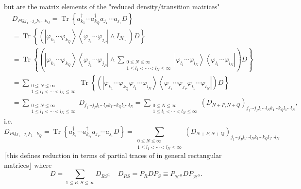 \documentclass[aps,preprint]{revtex4}%
\begin{document}
but are the matrix elements of the "reduced density/transition matrices"
\begin{align}
&  D_{PQj_{1}\cdots j_{P}k_{1}\cdots k_{Q}}=\operatorname{Tr}\left\{
a_{k_{1}}^{\dagger}\cdots a_{k_{Q}}^{\dagger}a_{j_{P}}\cdots a_{j_{1}%
}D\right\} \nonumber\\
&  =\operatorname{Tr}\left\{  \left(  \left\vert \varphi_{k_{1}}\cdots
\varphi_{k_{Q}}\right\rangle \left\langle \varphi_{j_{1}}\cdots\varphi_{j_{P}%
}\right\vert \wedge I_{\mathcal{H}_{\mathcal{F}}}\right)  D\right\}
\nonumber\\
&  =\operatorname{Tr}\left\{  \left(  \left\vert \varphi_{k_{1}}\cdots
\varphi_{k_{Q}}\right\rangle \left\langle \varphi_{j_{1}}\cdots\varphi_{j_{P}%
}\right\vert \wedge\sum_{\substack{0\leq N\leq\infty\\1\leq l_{1}<\cdots
<l_{N}\leq\infty}}\left\vert \varphi_{l_{1}}\cdots\varphi_{l_{N}}\right\rangle
\left\langle \varphi_{l_{1}}\cdots\varphi_{l_{N}}\right\vert \right)
D\right\} \nonumber\\
&  =\sum_{\substack{0\leq N\leq\infty\\1\leq l_{1}<\cdots<l_{N}\leq\infty
}}\operatorname{Tr}\left\{  \left(  \left\vert \varphi_{k_{1}}\cdots
\varphi_{k_{Q}}\varphi_{l_{1}}\cdots\varphi_{l_{N}}\right\rangle \left\langle
\varphi_{j_{1}}\cdots\varphi_{j_{P}}\varphi_{l_{1}}\cdots\varphi_{l_{N}%
}\right\vert \right)  D\right\} \nonumber\\
&  =\sum_{\substack{0\leq N\leq\infty\\1\leq l_{1}<\cdots<l_{N}\leq\infty
}}D_{j_{1}\cdots j_{P}l_{1}\cdots l_{N}k_{1}\cdots k_{Q}l_{1}\cdots l_{N}%
}=\sum_{\substack{0\leq N\leq\infty\\1\leq l_{1}<\cdots<l_{N}\leq\infty
}}\left(  D_{N+P,N+Q}\right)  _{j_{1}\cdots j_{P}l_{1}\cdots l_{N}k_{1}\cdots
k_{Q}l_{1}\cdots l_{N}},
\end{align}
i.e.
\begin{equation}
D_{PQj_{1}\cdots j_{P}k_{1}\cdots k_{Q}}=\operatorname{Tr}\left\{  a_{k_{1}%
}^{\dagger}\cdots a_{k_{Q}}^{\dagger}a_{j_{P}}\cdots a_{j_{1}}D\right\}
=\sum_{\substack{0\leq N\leq\infty\\1\leq l_{1}<\cdots<l_{N}\leq\infty
}}\left(  D_{N+P,N+Q}\right)  _{j_{1}\cdots j_{P}l_{1}\cdots l_{N}k_{1}\cdots
k_{Q}l_{1}\cdots l_{N}}%
\end{equation}
$\lceil$this defines reduction in terms of partial traces of in general
rectangular matrices$\rfloor$ where
\begin{equation}
D=\sum_{1\leq R,S\leq\infty}D_{RS};\quad D_{RS}=P_{R}DP_{S}\equiv
P_{\mathcal{H}^{R}}DP_{\mathcal{H}^{S}}.
\end{equation}
\end{document}
